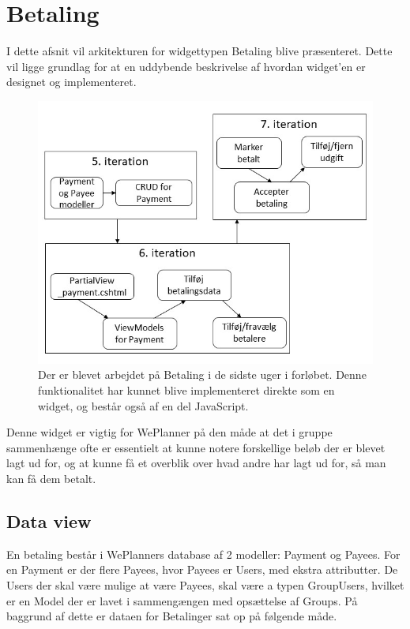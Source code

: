 \section{Betaling}

I dette afsnit vil arkitekturen for widgettypen Betaling blive præsenteret. Dette vil ligge grundlag for at en uddybende beskrivelse af hvordan widget'en er designet og implementeret. 

\begin{figure}[H]
    \centering
    \includegraphics[width=\linewidth]{09_Arkitektur/Payment/Images/iteraionerCropped1.jpg}
    \caption{Der er blevet arbejdet på Betaling i de sidste uger i forløbet. Denne funktionalitet har kunnet blive implementeret direkte som en widget, og består også af en del JavaScript.}
    \label{fig:paymentIterations}
\end{figure}


Denne widget er vigtig for WePlanner på den måde at det i gruppe sammenhænge ofte er essentielt at kunne notere forskellige beløb der er blevet lagt ud for, og at kunne få et overblik over hvad andre har lagt ud for, så man kan få dem betalt.

\subsection{Data view}

En betaling består i WePlanners database af 2 modeller: Payment og Payees. For en Payment er der flere Payees, hvor Payees er Users, med ekstra attributter. De Users der skal være mulige at være Payees, skal være a typen GroupUsers, hvilket er en Model der er lavet i sammengængen med opsættelse af Groups. På baggrund af dette er dataen for Betalinger sat op på følgende måde.

